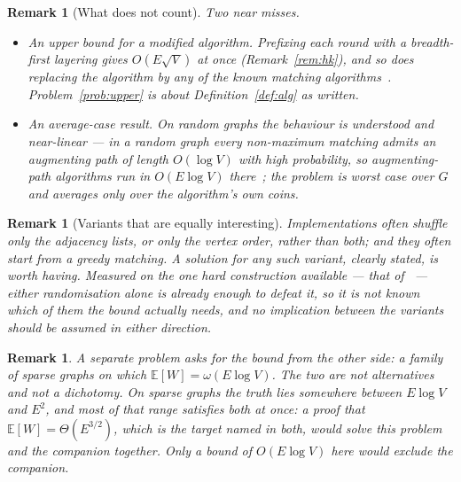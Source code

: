 \documentclass[10pt]{article}
\newtheorem{remark}[theorem]{Remark}
\newcommand{\Ex}{\mathbb{E}}
\begin{document}
\begin{remark}[What does not count]\label{rem:notcount}
Two near misses.
\begin{itemize}
  \item An upper bound for a modified algorithm. Prefixing each round with a
  breadth-first layering gives $O(E\sqrt V)$ at once
  (Remark~\ref{rem:hk}), and so does replacing the algorithm by any of the
  known matching algorithms~\cite{HopcroftKarp73,ABMP91,BLNPSSSW20,CKLPGS22}. Problem~\ref{prob:upper} is about
  Definition~\ref{def:alg} as written.
  \item An average-case result. On random graphs the behaviour is understood
  and near-linear --- in a random graph every non-maximum matching admits an
  augmenting path of length $O(\log V)$ with high probability, so
  augmenting-path algorithms run in $O(E\log V)$ there~\cite{BMST06}; the problem is worst case over $G$
  and averages only over the algorithm's own coins.
\end{itemize}
\end{remark}

\begin{remark}[Variants that are equally interesting]\label{rem:variants}
Implementations often shuffle only the adjacency lists, or only the vertex
order, rather than both; and they often start from a greedy matching. A
solution for any such variant, clearly stated, is worth having.
Measured on the one hard construction available --- that of~\cite{Dacin21} ---
either randomisation alone is already enough to defeat it, so it is not known
which of them the bound actually needs, and no implication between the variants
should be assumed in either direction.
\end{remark}

\begin{remark}\label{rem:dichotomy}
A separate problem asks for the bound from
the other side: a family of sparse graphs on which $\Ex[W]=\omega(E\log V)$.
The two are not alternatives and not a dichotomy. On sparse graphs the truth
lies somewhere between $E\log V$ and $E^{2}$, and most of that range satisfies
both at once: a proof that $\Ex[W]=\Theta(E^{3/2})$, which is the target named
in both, would solve this problem and the companion together. Only a bound of
$O(E\log V)$ here would exclude the companion.
\end{remark}
\end{document}
